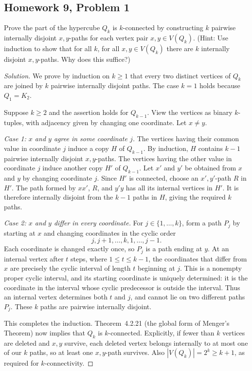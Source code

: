 \documentclass[12pt]{amsart}
\newenvironment{solution}{\begin{proof}[Solution]}{\end{proof}}
\begin{document}
    \subsection*{Homework 9, Problem 1} Prove the part of the hypercube $Q_k$ is $k$-connected by constructing
    $k$ pairwise internally disjoint $x,y$-paths for each vertex pair $x,y\in V(Q_k)$.
    (Hint: Use induction to show that for all $k$, for all $x,y\in V(Q_k)$ there are $k$
    internally disjoint $x,y$-paths.
    Why does this suffice?)

    \begin{solution}
        We prove by induction on $k\geq 1$ that every two distinct vertices of
        $Q_k$ are joined by $k$ pairwise internally disjoint paths.  The case
        $k=1$ holds because $Q_1=K_2$.

        Suppose $k\geq2$ and the assertion holds for $Q_{k-1}$.  View the
        vertices as binary $k$-tuples, with adjacency given by changing one
        coordinate.  Let $x\ne y$.

        \emph{Case 1: $x$ and $y$ agree in some coordinate $j$.}
        The vertices having their common value in coordinate $j$ induce a copy
        $H$ of $Q_{k-1}$.  By induction, $H$ contains $k-1$ pairwise internally
        disjoint $x,y$-paths.  The vertices having the other value in coordinate
        $j$ induce another copy $H'$ of $Q_{k-1}$.  Let $x'$ and $y'$ be obtained
        from $x$ and $y$ by changing coordinate $j$.  Since $H'$ is connected,
        choose an $x',y'$-path $R$ in $H'$.  The path formed by $xx'$, $R$, and
        $y'y$ has all its internal vertices in $H'$.  It is therefore internally
        disjoint from the $k-1$ paths in $H$, giving the required $k$ paths.

        \emph{Case 2: $x$ and $y$ differ in every coordinate.}
        For $j\in\{1,\ldots,k\}$, form a path $P_j$ by starting at $x$ and
        changing coordinates in the cyclic order
        \[
            j,j+1,\ldots,k,1,\ldots,j-1.
        \]
        Each coordinate is changed exactly once, so $P_j$ is a path ending at
        $y$.  At an internal vertex after $t$ steps, where $1\leq t\leq k-1$,
        the coordinates that differ from $x$ are precisely the cyclic interval
        of length $t$ beginning at $j$.  This is a nonempty proper cyclic
        interval, and its starting coordinate is uniquely determined: it is
        the coordinate in the interval whose cyclic predecessor is outside the
        interval.  Thus an internal vertex determines both $t$ and $j$, and
        cannot lie on two different paths $P_j$.  These $k$ paths are pairwise
        internally disjoint.

        This completes the induction.  Theorem~4.2.21 (the global form of
        Menger's Theorem) now implies that $Q_k$ is $k$-connected.  Explicitly,
        if fewer than $k$ vertices are deleted and $x,y$ survive, each deleted
        vertex belongs internally to at most one of our $k$ paths, so at least
        one $x,y$-path survives.  Also $|V(Q_k)|=2^k\geq k+1$, as required
        for $k$-connectivity.
    \end{solution}
\end{document}
